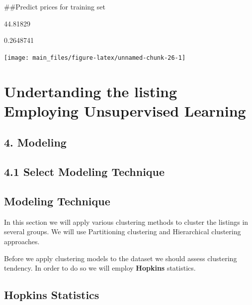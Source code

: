\#\#Predict prices for training set

\begin{Schunk}
\begin{Soutput}
[1] 44.81829
\end{Soutput}
\begin{Soutput}
[1] 0.2648741
\end{Soutput}
\end{Schunk}

\begin{Schunk}


\begin{center}\texttt{[image: main\_files/figure-latex/unnamed-chunk-26-1]} \end{center}

\end{Schunk}

\hypertarget{undertanding-the-listing-employing-unsupervised-learning}{%
\section{Undertanding the listing Employing Unsupervised
Learning}\label{undertanding-the-listing-employing-unsupervised-learning}}

\hypertarget{modeling-1}{%
\subsection{4. Modeling}\label{modeling-1}}

\hypertarget{select-modeling-technique-1}{%
\subsection{4.1 Select Modeling
Technique}\label{select-modeling-technique-1}}

\hypertarget{modeling-technique-1}{%
\subsection{Modeling Technique}\label{modeling-technique-1}}

In this section we will apply various clustering methods to cluster the
listings in several groups. We will use Partitioning clustering and
Hierarchical clustering approaches.

Before we apply clustering models to the dataset we should assess
clustering tendency. In order to do so we will employ \textbf{Hopkins}
statistics.

\hypertarget{hopkins-statistics}{%
\subsection{Hopkins Statistics}\label{hopkins-statistics}}

